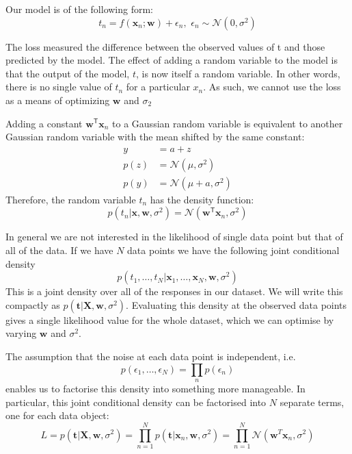 \documentclass[a4paper,11pt]{article} %
\begin{document}
Our model is of the following form:
\begin{equation}
t_{n} = f(\mathbf{x}_{n}; \mathbf{w}) + \epsilon_{n}, \,\, \epsilon_{n} \sim \mathcal{N}(0,\sigma^2)
\end{equation}

The loss measured the difference between the observed
values of t and those predicted by the model. The effect of adding a random variable
to the model is that the output of the model, $t$, is now itself a random variable. In
other words, there is no single value of $t_n$ for a particular $x_n$.
As such, we cannot use the loss as a means of optimizing $\mathbf{w}$
and $\sigma_{2}$

Adding a constant $\mathbf{w}^{\mathsf{T}}\mathbf{x}_{n}$ to a
Gaussian random variable is equivalent to another Gaussian random variable
with the mean shifted by the same constant:
\begin{align*}
y & = a + z \\
p(z) & = \mathcal{N}(\mu,\sigma^2) \\
p(y) & = \mathcal{N}(\mu + a,\sigma^2)
\end{align*}
Therefore, the random variable $t_n$ has the density function:
\begin{equation}
p(t_{n}|\mathbf{x},\mathbf{w},\sigma^2) =
\mathcal{N}(\mathbf{w}^{\mathsf{T}}\mathbf{x}_{n},\sigma^2)
\end{equation}


In general we are not interested in the likelihood of single data point but that of
all of the data. If we have $N$ data points we have the following joint conditional
density
\begin{equation*}
p(t_{1}, \ldots, t_{N} | \mathbf{x}_{1}, \ldots, \mathbf{x}_{N}, \mathbf{w}, \sigma^2)
\end{equation*}
This is a joint density over all of the responses in our dataset.
We will write this compactly
as $p( \mathbf{t} | \mathbf{X}, \mathbf{w}, \sigma^2)$.
Evaluating this density at the observed data points gives a single
likelihood value for the whole dataset, which we can optimise by varying $\mathbf{w}$
and $\sigma^2$.

The assumption that the noise at each data point is independent, i.e.
\begin{equation*}
p(\epsilon_{1}, \ldots, \epsilon_{N}) = \prod_{n} p(\epsilon_{n})
\end{equation*}
enables us to factorise this density into something more manageable. In
particular, this joint conditional density can be factorised into $N$ separate terms,
one for each data object:
\begin{equation}
L = p(\mathbf{t} | \mathbf{X},\mathbf{w},\sigma^2)
= \prod_{n=1}^{N} p(\mathbf{t} | \mathbf{x}_{n},\mathbf{w},\sigma^2)
= \prod_{n=1}^{N} \mathcal{N}(\mathbf{w}^{T}\mathbf{x}_{n},\sigma^2)
\end{equation}
\end{document}
